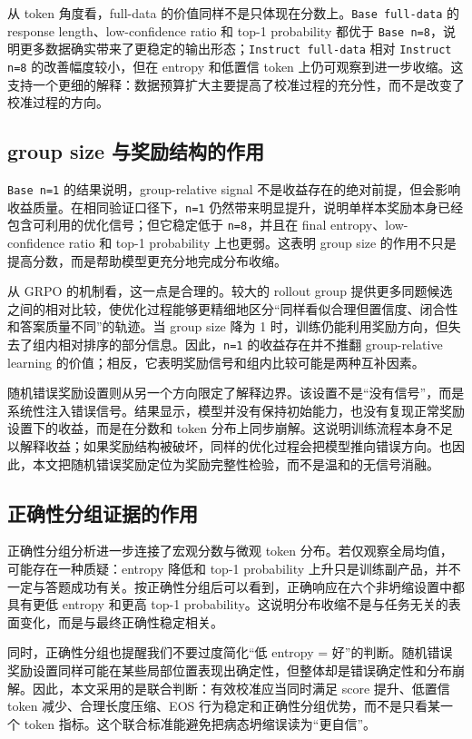 \documentclass[12pt,a4paper]{ctexart}
\begin{document}
从 token 角度看，full-data 的价值同样不是只体现在分数上。\texttt{Base full-data} 的 response length、low-confidence ratio 和 top-1 probability 都优于 \texttt{Base n=8}，说明更多数据确实带来了更稳定的输出形态；\texttt{Instruct full-data} 相对 \texttt{Instruct n=8} 的改善幅度较小，但在 entropy 和低置信 token 上仍可观察到进一步收缩。这支持一个更细的解释：数据预算扩大主要提高了校准过程的充分性，而不是改变了校准过程的方向。

\subsection{group size 与奖励结构的作用}

\texttt{Base n=1} 的结果说明，group-relative signal 不是收益存在的绝对前提，但会影响收益质量。在相同验证口径下，\texttt{n=1} 仍然带来明显提升，说明单样本奖励本身已经包含可利用的优化信号；但它稳定低于 \texttt{n=8}，并且在 final entropy、low-confidence ratio 和 top-1 probability 上也更弱。这表明 group size 的作用不只是提高分数，而是帮助模型更充分地完成分布收缩。

从 GRPO 的机制看，这一点是合理的。较大的 rollout group 提供更多同题候选之间的相对比较，使优化过程能够更精细地区分“同样看似合理但置信度、闭合性和答案质量不同”的轨迹。当 group size 降为 1 时，训练仍能利用奖励方向，但失去了组内相对排序的部分信息。因此，\texttt{n=1} 的收益存在并不推翻 group-relative learning 的价值；相反，它表明奖励信号和组内比较可能是两种互补因素。

随机错误奖励设置则从另一个方向限定了解释边界。该设置不是“没有信号”，而是系统性注入错误信号。结果显示，模型并没有保持初始能力，也没有复现正常奖励设置下的收益，而是在分数和 token 分布上同步崩解。这说明训练流程本身不足以解释收益；如果奖励结构被破坏，同样的优化过程会把模型推向错误方向。也因此，本文把随机错误奖励定位为奖励完整性检验，而不是温和的无信号消融。

\subsection{正确性分组证据的作用}

正确性分组分析进一步连接了宏观分数与微观 token 分布。若仅观察全局均值，可能存在一种质疑：entropy 降低和 top-1 probability 上升只是训练副产品，并不一定与答题成功有关。按正确性分组后可以看到，正确响应在六个非坍缩设置中都具有更低 entropy 和更高 top-1 probability。这说明分布收缩不是与任务无关的表面变化，而是与最终正确性稳定相关。

同时，正确性分组也提醒我们不要过度简化“低 entropy = 好”的判断。随机错误奖励设置同样可能在某些局部位置表现出确定性，但整体却是错误确定性和分布崩解。因此，本文采用的是联合判断：有效校准应当同时满足 score 提升、低置信 token 减少、合理长度压缩、EOS 行为稳定和正确性分组优势，而不是只看某一个 token 指标。这个联合标准能避免把病态坍缩误读为“更自信”。
\end{document}
